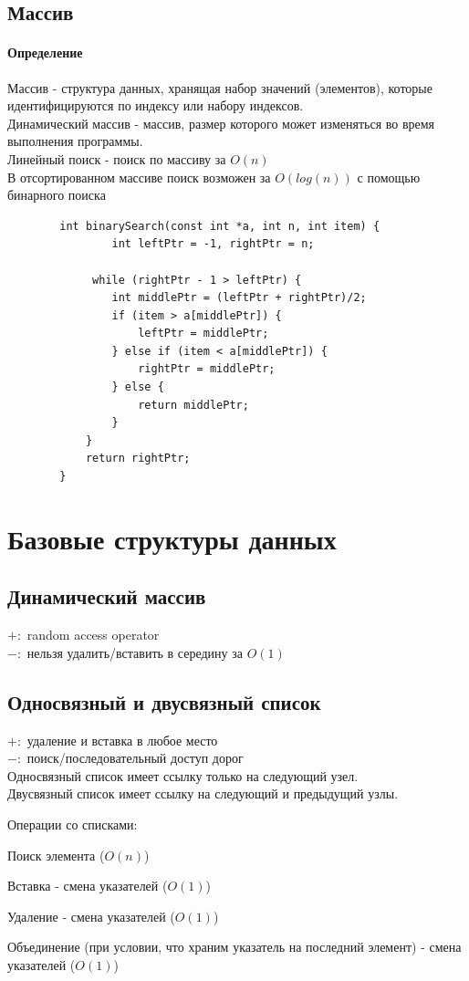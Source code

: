 \documentclass[a4paper,10pt]{article}
\begin{document}
	\subsection{Массив}
	\paragraph{Определение} Массив - структура данных, хранящая набор значений (элементов), которые идентифицируются по индексу или набору индексов. \\
	Динамический массив - массив, размер которого может изменяться во время выполнения программы. \\
	
	Линейный поиск - поиск по массиву за $O(n)$ \\
	В отсортированном массиве поиск возможен за $O(log(n))$ с помощью бинарного поиска \\
	\begin{lstlisting}
		int binarySearch(const int *a, int n, int item) {
    			int leftPtr = -1, rightPtr = n;

			 while (rightPtr - 1 > leftPtr) {
				int middlePtr = (leftPtr + rightPtr)/2;
				if (item > a[middlePtr]) {
					leftPtr = middlePtr;
				} else if (item < a[middlePtr]) {
					rightPtr = middlePtr;
				} else {
					return middlePtr;
				}
			}
			return rightPtr;
		}
	\end{lstlisting}
	\newpage
	\section{Базовые структуры данных}
	\subsection{Динамический массив}
	$+\colon$ random access operator \\
	$-\colon$ нельзя удалить/вставить в середину за $O(1)$
	\subsection{Односвязный и двусвязный список}
	$+\colon$ удаление и вставка в любое место \\
	$-\colon$ поиск/последовательный доступ дорог \\
	Односвязный список имеет ссылку только на следующий узел. \\
	Двусвязный список имеет ссылку на следующий и предыдущий узлы. \\
	\begin{center}
		Операции со списками: \\
		\item Поиск элемента ($O(n)$)
		\item Вставка - смена указателей ($O(1)$)
		\item Удаление - смена указателей ($O(1)$)
		\item Объединение (при условии, что храним указатель на последний элемент) - смена указателей ($O(1)$)
	\end{center}
\end{document}
